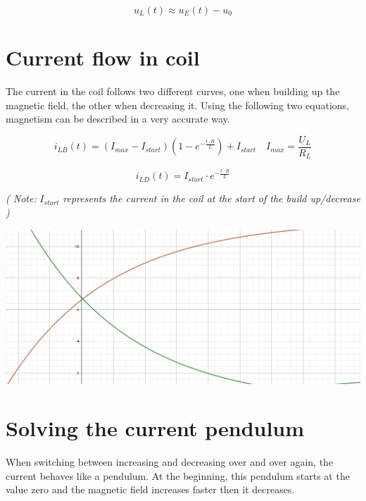 \documentclass{article}
\begin{document}
    \begin{equation}
        u_L(t) \approx u_E(t) - u_0
    \end{equation}
    
\section {Current flow in coil}

    The current in the coil follows two different curves, one when building up the magnetic field, the other when decreasing it. Using the following two equations, magnetism can be described in a very accurate way.
    
    \begin{equation}
        i_{LB}(t) = (I_{max} - I_{start})( 1 - e^{- \frac{t \cdot R}{L}}) + I_{start} \quad
        I_{max} = \frac{U_L}{R_L}
    \end{equation}
    
    \begin{equation}
        i_{LD}(t) = I_{start} \cdot e^{- \frac{t \cdot R}{L}}
    \end{equation}
    
    \textit{( Note: } $I_{start}$ \textit{represents the current in the coil at the start of the build up/decrease )}
    
    \begin{center}
        \includegraphics[scale=0.4]{images/IncreaseAndDecrease.PNG}
    \end{center}
    
\section{Solving the current pendulum}
    
    When switching between increasing and decreasing over and over again, the current behaves like a pendulum. At the beginning, this pendulum starts at the value zero and the magnetic field increases faster then it decreases. 
    
\end{document}

